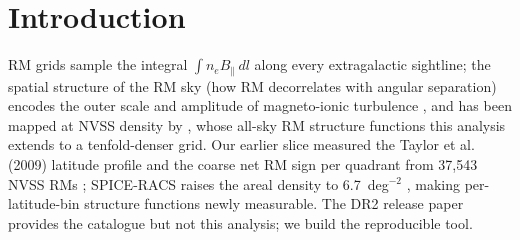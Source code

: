 \documentclass[twocolumn]{aastex631}
\begin{document}

\section{Introduction}
RM grids sample the integral $\int n_e B_\parallel\,dl$ along every extragalactic sightline; the
spatial structure of the RM sky (how RM decorrelates with angular separation) encodes
the outer scale and amplitude of magneto-ionic turbulence \citep{haverkorn2004}, and has been
mapped at NVSS density by \citet{stil2011}, whose all-sky RM structure functions this analysis
extends to a tenfold-denser grid. Our earlier
slice measured the Taylor et al. (2009) latitude profile and the coarse net RM sign per
quadrant from 37,543 NVSS RMs \citep{taylor2009}; SPICE-RACS raises the areal density to
6.7~deg$^{-2}$ \citep{thomson2023,spiceracs_dr2}, making per-latitude-bin structure functions
newly measurable. The DR2
release paper provides the catalogue but not this analysis; we build the reproducible tool.
\end{document}
